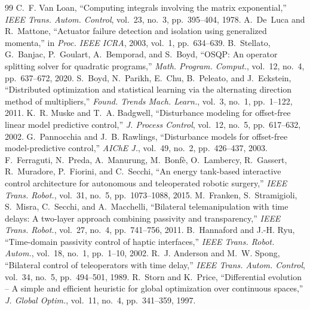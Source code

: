 \documentclass[11pt,a4paper]{article}
\theoremstyle{remark}
\theoremstyle{definition}
\begin{document}
\begin{thebibliography}{99}\small
{} C.~F. Van Loan, ``Computing integrals involving the matrix exponential,'' \emph{IEEE Trans. Autom. Control}, vol.~23, no.~3, pp.~395--404, 1978.
 A.~De~Luca and R.~Mattone, ``Actuator failure detection and isolation using generalized momenta,'' in \emph{Proc. IEEE ICRA}, 2003, vol.~1, pp.~634--639.
 B.~Stellato, G.~Banjac, P.~Goulart, A.~Bemporad, and S.~Boyd, ``OSQP: An operator splitting solver for quadratic programs,'' \emph{Math. Program. Comput.}, vol.~12, no.~4, pp.~637--672, 2020.
 S.~Boyd, N.~Parikh, E.~Chu, B.~Peleato, and J.~Eckstein, ``Distributed optimization and statistical learning via the alternating direction method of multipliers,'' \emph{Found. Trends Mach. Learn.}, vol.~3, no.~1, pp.~1--122, 2011.
 K.~R. Muske and T.~A. Badgwell, ``Disturbance modeling for offset-free linear model predictive control,'' \emph{J. Process Control}, vol.~12, no.~5, pp.~617--632, 2002.
 G.~Pannocchia and J.~B. Rawlings, ``Disturbance models for offset-free model-predictive control,'' \emph{AIChE J.}, vol.~49, no.~2, pp.~426--437, 2003.
 F.~Ferraguti, N.~Preda, A.~Manurung, M.~Bonf\`e, O.~Lambercy, R.~Gassert, R.~Muradore, P.~Fiorini, and C.~Secchi, ``An energy tank-based interactive control architecture for autonomous and teleoperated robotic surgery,'' \emph{IEEE Trans. Robot.}, vol.~31, no.~5, pp.~1073--1088, 2015.
 M.~Franken, S.~Stramigioli, S.~Misra, C.~Secchi, and A.~Macchelli, ``Bilateral telemanipulation with time delays: A two-layer approach combining passivity and transparency,'' \emph{IEEE Trans. Robot.}, vol.~27, no.~4, pp.~741--756, 2011.
 B.~Hannaford and J.-H. Ryu, ``Time-domain passivity control of haptic interfaces,'' \emph{IEEE Trans. Robot. Autom.}, vol.~18, no.~1, pp.~1--10, 2002.
 R.~J. Anderson and M.~W. Spong, ``Bilateral control of teleoperators with time delay,'' \emph{IEEE Trans. Autom. Control}, vol.~34, no.~5, pp.~494--501, 1989.
 R.~Storn and K.~Price, ``Differential evolution -- A simple and efficient heuristic for global optimization over continuous spaces,'' \emph{J. Global Optim.}, vol.~11, no.~4, pp.~341--359, 1997.
\end{thebibliography}
\end{document}
